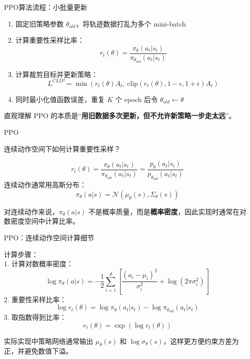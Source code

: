 \documentclass{beamer}
\begin{document}
\begin{frame}{PPO算法流程：小批量更新}
    \begin{enumerate}
        \item 固定旧策略参数 $\theta_{old}$，将轨迹数据打乱为多个 mini-batch
        \item 计算重要性采样比率：
        \[
        r_t(\theta) = \frac{\pi_\theta(a_t|s_t)}{\pi_{\theta_{old}}(a_t|s_t)}
        \]
        \item 计算裁剪目标并更新策略：
        \[
        L^{CLIP} = \min\left( r_t(\theta) A_t,\ \text{clip}(r_t(\theta),1-\epsilon,1+\epsilon)A_t \right)
        \]
        \item 同时最小化值函数误差，重复 $K$ 个 epoch 后令 $\theta_{old} \leftarrow \theta$
    \end{enumerate}

    \begin{block}{直观理解}
        PPO 的本质是“\textbf{用旧数据多次更新，但不允许新策略一步走太远}”。
    \end{block}
\end{frame}
\begin{frame}{PPO}
    \begin{block}{连续动作空间下如何计算重要性采样？}
    \end{block}
        $$r_t(\theta) = \frac{\pi_\theta(a_t|s_t)}{\pi_{\theta_{old}}(a_t|s_t)} = \frac{p_\theta(a_t|s_t)}{p_{\theta_{old}}(a_t|s_t)}$$
连续动作通常用高斯分布：
$$\pi_\theta(a|s) = \mathcal{N}(\mu_\theta(s), \Sigma_\theta(s))$$

\vspace{0.2cm}
{\small 对连续动作来说，$\pi_\theta(a|s)$ 不是概率质量，而是\textbf{概率密度}，因此实现时通常在对数密度空间中计算比率。}

\end{frame}
\begin{frame}{PPO：连续动作空间计算细节}

计算步骤：\\
1. 计算对数概率密度：
$$\log \pi_\theta(a|s) = -\frac{1}{2}\sum_{i=1}^d \left[\frac{(a_i - \mu_i)^2}{\sigma_i^2} + \log(2\pi\sigma_i^2)\right]$$
2. 重要性采样比率：
$$\log r_t(\theta) = \log \pi_\theta(a_t|s_t) - \log \pi_{\theta_{old}}(a_t|s_t)$$
3. 取指数得到比率：
$$r_t(\theta) = \exp\left(\log r_t(\theta)\right)$$

\vspace{0.2cm}
{\small 实际实现中策略网络通常输出 $\mu_\theta(s)$ 和 $\log \sigma_\theta(s)$，这样更方便约束方差为正，并避免数值下溢。}

\end{frame}
\end{document}
